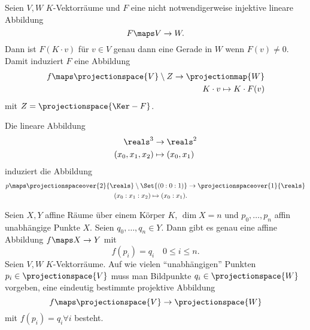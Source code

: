 \begin{bemerkung*}
  Seien \( V,W \) \( K \)-Vektorräume und \( F \) eine nicht notwendigerweise injektive lineare Abbildung
  \begin{equation*}
    F\maps V\to W.
  \end{equation*}
  Dann ist \( F(K\cdot v) \) für \( v\in V \) genau dann eine Gerade in \( W \) wenn \( F(v)\neq 0 \). Damit induziert \( F \) eine Abbildung
  \begin{equation*}
    \begin{split}
      f\maps \projectionspace{V}\setminus Z\to \projectionmap{W}\\
      K\cdot v\mapsto K\cdot F(v)
    \end{split}
  \end{equation*}
  mit \( Z=\projectionspace{\Ker-{F}} \).
\end{bemerkung*}
\begin{beispiel*}
  Die lineare Abbildung 
  \begin{equation*}
    \begin{split}
      \reals^3&\to \reals^2\\
      (x_0,x_1,x_2)&\mapsto (x_0,x_1)
    \end{split}
  \end{equation*}
  induziert die Abbildung
  \begin{equation*}
    \begin{split}
      p\maps \projectionspaceover{2}{\reals}\setminus\Set{(0:0:1)}&\to \projectionspaceover{1}{\reals}\\
      (x_0:x_1:x_2)\mapsto (x_0:x_1).
    \end{split}
  \end{equation*}
  \begin{erinnerung*}
    Seien \( X,Y \) affine Räume über einem Körper \( K \), \( \dim X=n \) und \( p_0,\dotsc,p_n \) affin unabhängige Punkte \( X \). Seien \( q_0,\dotsc,q_n\in Y \). Dann gibt es genau eine affine Abbildung \( f\maps X\to Y \) mit
    \begin{equation*}
      f(p_i)=q_i\quad 0\leq i\leq n.
    \end{equation*}
    Seien \( V,W \) \( K \)-Vektorräume. Auf wie vielen \enquote{unabhängigen} Punkten \( p_i\in \projectionspace{V} \) muss man Bildpunkte \( q_i\in \projectionspace{W} \) vorgeben, \sd eine eindeutig bestimmte projektive Abbildung
    \begin{equation*}
      f\maps \projectionspace{V}\to \projectionspace{W}
    \end{equation*}
    mit \( f(p_i)=q_i \forall i\) besteht.
  \end{erinnerung*}
\end{beispiel*}
